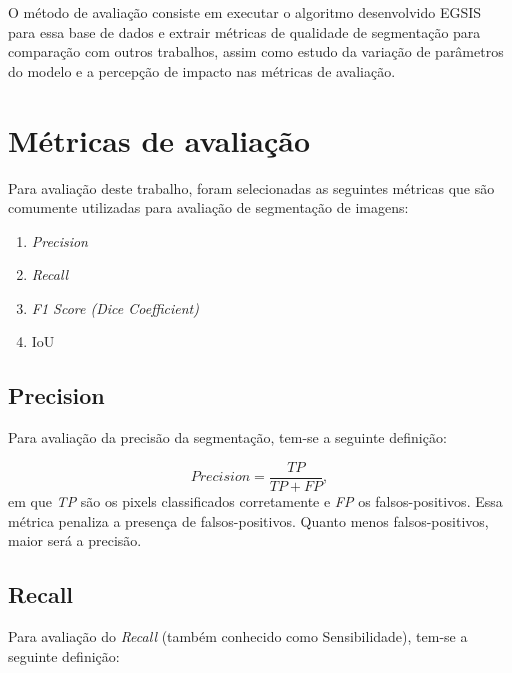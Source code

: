 
O método de avaliação consiste em executar o algoritmo desenvolvido
\gls{EGSIS} para essa base de dados e extrair métricas de qualidade de
segmentação para comparação com outros trabalhos, assim como estudo da
variação de parâmetros do modelo e a percepção de impacto nas métricas
de avaliação.

\section{Métricas de avaliação}\label{sec:metricas-avaliacao}

Para avaliação deste trabalho, foram selecionadas as seguintes métricas
que são comumente utilizadas para avaliação de segmentação de imagens:

\begin{enumerate}
\item \textit{Precision}
\item \textit{Recall}
\item \textit{F1 Score (Dice Coefficient)}
\item IoU
\end{enumerate}


\subsection{Precision}\label{sec:precision}

Para avaliação da precisão da segmentação, tem-se a seguinte definição:

\begin{equation}\label{eq:precision}
  Precision = \dfrac{TP}{TP + FP},
\end{equation}
\noindent
em que \textit{TP} são os pixels classificados corretamente e
\textit{FP} os falsos-positivos. Essa métrica penaliza a presença de
falsos-positivos. Quanto menos falsos-positivos, maior será a
precisão.


\subsection{Recall}\label{sec:recall}

Para avaliação do \textit{Recall} (também conhecido como Sensibilidade), tem-se a seguinte definição:

